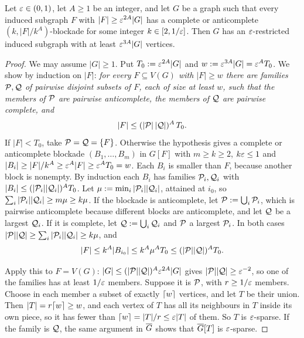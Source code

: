\begin{lemma}\label{lem:c01b}
Let $\varepsilon\in(0,1)$, let $A\ge1$ be an integer, and let $G$ be a graph such that every induced subgraph $F$
with $|F|\ge\varepsilon^{2A}|G|$ has a complete or anticomplete $(k,|F|/k^A)$-blockade for some integer
$k\in[2,1/\varepsilon]$. Then $G$ has an $\varepsilon$-restricted induced subgraph with at least $\varepsilon^{3A}|G|$ vertices.
\end{lemma}
\begin{proof}
We may assume $|G|\ge1$. Put $T_0:=\varepsilon^{2A}|G|$ and $w:=\varepsilon^{3A}|G|=\varepsilon^AT_0$. We show by induction on
$|F|$: \emph{for every $F\subseteq V(G)$ with $|F|\ge w$ there are families $\mathcal{P},\mathcal{Q}$ of pairwise
disjoint subsets of $F$, each of size at least $w$, such that the members of $\mathcal{P}$ are pairwise
anticomplete, the members of $\mathcal{Q}$ are pairwise complete, and}
\[
|F|\le(|\mathcal{P}|\,|\mathcal{Q}|)^A\,T_0 .
\]
If $|F|<T_0$, take $\mathcal{P}=\mathcal{Q}=\{F\}$. Otherwise the hypothesis gives a complete or anticomplete blockade
$(B_1,\dots,B_m)$ in $G[F]$ with $m\ge k\ge2$, $k\varepsilon\le1$ and $|B_i|\ge|F|/k^A\ge\varepsilon^A|F|\ge\varepsilon^AT_0=w$. Each
$B_i$ is smaller than $F$, because another block is nonempty. By induction each $B_i$ has families
$\mathcal{P}_i,\mathcal{Q}_i$ with $|B_i|\le(|\mathcal{P}_i||\mathcal{Q}_i|)^AT_0$. Let $\mu:=\min_i|\mathcal{P}_i||\mathcal{Q}_i|$, attained at
$i_0$, so $\sum_i|\mathcal{P}_i||\mathcal{Q}_i|\ge m\mu\ge k\mu$. If the blockade is anticomplete, let
$\mathcal{P}:=\bigcup_i\mathcal{P}_i$, which is pairwise anticomplete because different blocks are anticomplete, and
let $\mathcal{Q}$ be a largest $\mathcal{Q}_i$. If it is complete, let $\mathcal{Q}:=\bigcup_i\mathcal{Q}_i$ and $\mathcal{P}$ a largest
$\mathcal{P}_i$. In both cases $|\mathcal{P}||\mathcal{Q}|\ge\sum_i|\mathcal{P}_i||\mathcal{Q}_i|\ge k\mu$, and
\[
|F|\le k^A|B_{i_0}|\le k^A\mu^AT_0\le(|\mathcal{P}||\mathcal{Q}|)^AT_0 .
\]

Apply this to $F=V(G)$: $|G|\le(|\mathcal{P}||\mathcal{Q}|)^A\varepsilon^{2A}|G|$ gives $|\mathcal{P}||\mathcal{Q}|\ge\varepsilon^{-2}$, so one of the
families has at least $1/\varepsilon$ members. Suppose it is $\mathcal{P}$, with $r\ge1/\varepsilon$ members. Choose in each
member a subset of exactly $\lceil w\rceil$ vertices, and let $T$ be their union. Then $|T|=r\lceil w\rceil\ge w$, and each
vertex of $T$ has all its neighbours in $T$ inside its own piece, so it has fewer than $\lceil w\rceil=|T|/r\le\varepsilon|T|$
of them. So $T$ is $\varepsilon$-sparse. If the family is $\mathcal{Q}$, the same argument in $\overline{G}$ shows that $\overline{G}[T]$ is
$\varepsilon$-sparse.
\end{proof}

